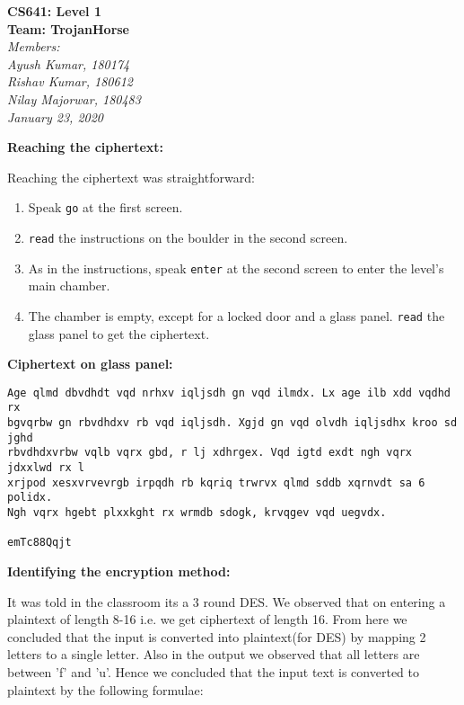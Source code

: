 \documentclass[11pt]{article}
\begin{document}
\begin{center}
  \Large\textbf{CS641: Level 1}\\
  \Large\textbf{Team: TrojanHorse}\\
  \medskip
  \large\textit{Members:\quad}\\
  \large\textit{Ayush Kumar, 180174\quad}\\
  \large\textit{Rishav Kumar, 180612\quad}\\
  \large\textit{Nilay Majorwar, 180483\quad}\\
  \medskip
  \large\textit{January 23, 2020\quad}
\end{center}

\bigskip
\bigskip

\textbf{Reaching the ciphertext: }
\medskip

Reaching the ciphertext was straightforward:
\begin{enumerate}
  \item Speak \texttt{go} at the first screen.
  \item \texttt{read} the instructions on the boulder in the second screen.
  \item As in the instructions, speak \texttt{enter} at the second screen to enter the level's main chamber.
  \item The chamber is empty, except for a locked door and a glass panel. \texttt{read} the glass panel to get the ciphertext.
\end{enumerate}

\bigskip
\bigskip

\textbf{Ciphertext on glass panel: }

\begin{lstlisting}
Age qlmd dbvdhdt vqd nrhxv iqljsdh gn vqd ilmdx. Lx age ilb xdd vqdhd rx 
bgvqrbw gn rbvdhdxv rb vqd iqljsdh. Xgjd gn vqd olvdh iqljsdhx kroo sd jghd 
rbvdhdxvrbw vqlb vqrx gbd, r lj xdhrgex. Vqd igtd exdt ngh vqrx jdxxlwd rx l 
xrjpod xesxvrvevrgb irpqdh rb kqriq trwrvx qlmd sddb xqrnvdt sa 6 polidx. 
Ngh vqrx hgebt plxxkght rx wrmdb sdogk, krvqgev vqd uegvdx.

emTc88Qqjt
\end{lstlisting}

\bigskip
\bigskip

\textbf{Identifying the encryption method: }
\medskip

It was told in the classroom its a 3 round DES. We observed that on entering a plaintext of length 8-16 i.e. we get ciphertext of length 16. From here we concluded that the input is converted into plaintext(for DES) by mapping 2 letters to a single letter. Also in the output we observed that all letters are between 'f' and 'u'. Hence we concluded that the input text is converted to plaintext by the following formulae:
\end{document}
